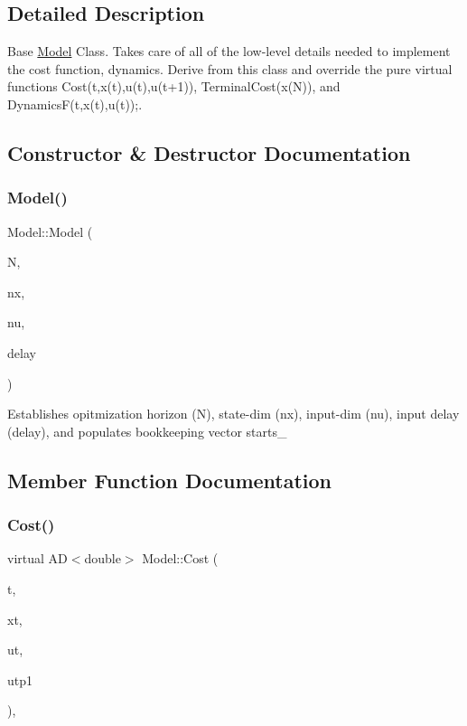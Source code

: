 \subsection{Detailed Description}
Base \mbox{\hyperlink{classModel}{Model}} Class. Takes care of all of the low-\/level details needed to implement the cost function, dynamics. Derive from this class and override the pure virtual functions Cost(t,x(t),u(t),u(t+1)), Terminal\+Cost(x(\+N)), and DynamicsF(t,x(t),u(t));. 

\subsection{Constructor \& Destructor Documentation}
\mbox{\label{classModel_ae594ebc83ab169fcccda2c9e238c0d90}} 
\subsubsection{\texorpdfstring{Model()}{Model()}}
{\footnotesize\ttfamily Model\+::\+Model (\begin{DoxyParamCaption}\item[{int}]{N,  }\item[{int}]{nx,  }\item[{int}]{nu,  }\item[{int}]{delay }\end{DoxyParamCaption})\hspace{0.3cm}{\ttfamily [inline]}}

Establishes opitmization horizon (N), state-\/dim (nx), input-\/dim (nu), input delay (delay), and populates bookkeeping vector starts\+\_\+ 

\subsection{Member Function Documentation}
\mbox{\label{classModel_aeae66d77dcacb0121cf68f268f1d05c7}} 
\subsubsection{\texorpdfstring{Cost()}{Cost()}}
{\footnotesize\ttfamily virtual AD$<$double$>$ Model\+::\+Cost (\begin{DoxyParamCaption}\item[{int}]{t,  }\item[{const A\+D\+Vec \&}]{xt,  }\item[{const A\+D\+Vec \&}]{ut,  }\item[{const A\+D\+Vec \&}]{utp1 }\end{DoxyParamCaption})\hspace{0.3cm}{\ttfamily [protected]}, {}}




